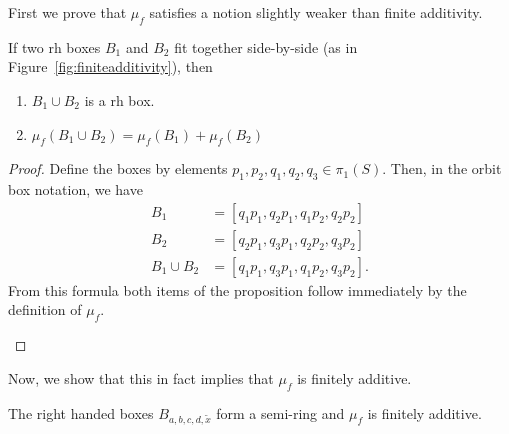 First we prove that $\mu_f$ satisfies a notion slightly weaker than finite additivity.

\begin{proposition}
  If two rh boxes $B_1$ and $B_2$ fit together side-by-side (as in Figure~\ref{fig:finiteadditivity}), then
  \begin{enumerate}
      \item $B_1 \cup B_2$ is a rh box.
      \item $\mu_f(B_1 \cup B_2) = \mu_f(B_1) + \mu_f(B_2)$
  \end{enumerate}
  \label{prop:sidebyside}
\end{proposition}

\begin{proof}
  Define the boxes by elements $p_1,p_2,q_1,q_2,q_3 \in \pi_1(S)$.
  Then, in the orbit box notation, we have
  \begin{align*}
    B_1 &= [q_1 p_1, q_2 p_1, q_1 p_2, q_2 p_2]\\
    B_2 &= [q_2 p_1, q_3 p_1, q_2 p_2, q_3 p_2]\\
    B_1 \cup B_2 &= [q_1 p_1, q_3 p_1, q_1 p_2, q_3 p_2].
  \end{align*}
  From this formula both items of the proposition follow immediately by the definition of $\mu_f$. \qedhere

  \begin{figure}
\end{figure}
\end{proof}

Now, we show that this in fact implies that $\mu_f$ is finitely additive.

\begin{proposition}
\label{prop:RHsemiring}
The right handed boxes $B_{a,b,c,d,\tilde{x}}$ form a semi-ring and $\mu_f$ is finitely additive.
\end{proposition}

